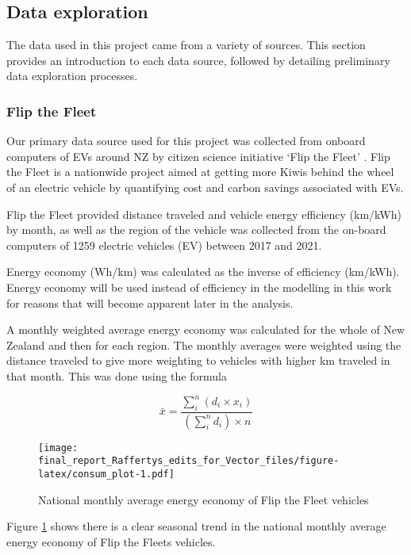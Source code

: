 \documentclass[
]{article}
\begin{document}
\hypertarget{data-exploration}{%
\subsection{Data exploration}\label{data-exploration}}

The data used in this project came from a variety of sources. This
section provides an introduction to each data source, followed by
detailing preliminary data exploration processes.

\hypertarget{flip-the-fleet}{%
\subsubsection{Flip the Fleet}\label{flip-the-fleet}}

Our primary data source used for this project was collected from onboard
computers of EVs around NZ by citizen science initiative `Flip the
Fleet' \cite{ftf}. Flip the Fleet is a nationwide project aimed at
getting more Kiwis behind the wheel of an electric vehicle by
quantifying cost and carbon savings associated with EVs.

Flip the Fleet provided distance traveled and vehicle energy efficiency
(km/kWh) by month, as well as the region of the vehicle was collected
from the on-board computers of 1259 electric vehicles (EV) between 2017
and 2021.

Energy economy (Wh/km) was calculated as the inverse of efficiency
(km/kWh). Energy economy will be used instead of efficiency in the
modelling in this work for reasons that will become apparent later in
the analysis.

A monthly weighted average energy economy was calculated for the whole
of New Zealand and then for each region. The monthly averages were
weighted using the distance traveled to give more weighting to vehicles
with higher km traveled in that month. This was done using the formula

\[\bar{x} = \frac{\sum_{i}^{n} (d_i\times x_i)}{\left(\sum_{i}^{n} d_i\right)\times n}\]

\begin{figure}
\centering
\texttt{[image: final\_report\_Raffertys\_edits\_for\_Vector\_files/figure-latex/consum\_plot-1.pdf]}
\caption{National monthly average energy economy of Flip the Fleet
vehicles\label{fig:consum_plot}}
\end{figure}

Figure \ref{fig:consum_plot} shows there is a clear seasonal trend in
the national monthly average energy economy of Flip the Fleets vehicles.
\end{document}
